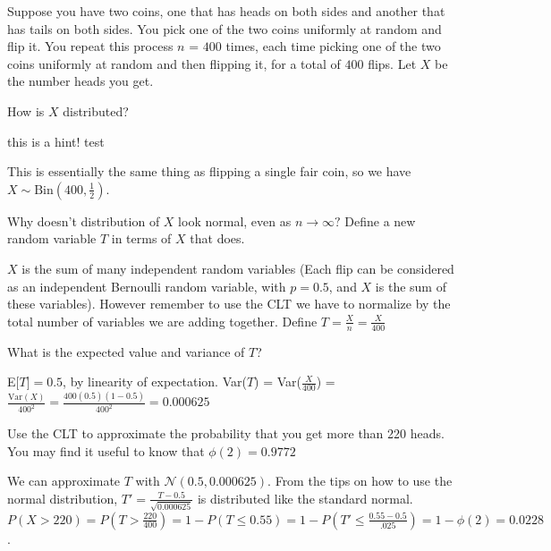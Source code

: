 Suppose you have two coins, one that has heads on both sides and another that has tails on both sides. You pick one of the two coins uniformly at random and flip it. You repeat this process $n$ = $400$ times, each time picking one of the two coins uniformly at random and then flipping it, for a total of $400$ flips. Let $X$ be the number heads you get.

\begin{question}
How is $X$ distributed?

\hint this is a hint!
test

\begin{solution}
This is essentially the same thing as flipping a single fair coin, so we have $X \mathtt{\sim} \mathrm{Bin}(400, \frac{1}{2})$.
\end{solution}
\end{question}

\begin{question}
Why doesn't distribution of $X$ look normal, even as $n \to \infty?$  Define a new random variable $T$ in terms of $X$ that does.

\begin{solution}
$X$ is the sum of many independent random variables (Each flip can be considered as an independent Bernoulli random variable, with $p = 0.5$, and $X$ is the sum of these variables). However remember to use the CLT we have to normalize by the total number of variables we are adding together. Define $T = \frac{X}{n} = \frac{X}{400}$
\end{solution}
\end{question}

\begin{question}
What is the expected value and variance of $T$?

\begin{solution}
E[$T] = 0.5$, by linearity of expectation. Var($T$) = Var($\frac{X}{400}$)  = $\frac{\text{Var}(X)}{400^2} = \frac{400(0.5)(1-0.5)}{400^2} = 0.000625$
\end{solution}
\end{question}

\begin{question}
Use the CLT to approximate the probability that you get more than 220 heads. You may find it useful to know that $\phi(2) = 0.9772$

\begin{solution}
We can approximate $T$ with $\mathcal{N}(0.5, 0.000625)$. From the tips on how to use the normal distribution, $T' = \frac{T-0.5}{\sqrt{0.000625}}$ is distributed like the standard normal. 
$P(X>220) = P(T>\frac{220}{400}) = 1 - P(T \leq 0.55) = 1 - P(T' \leq \frac{0.55-0.5}{.025}) = 1 - \phi(2) = 0.0228$.
\end{solution}
\end{question}
